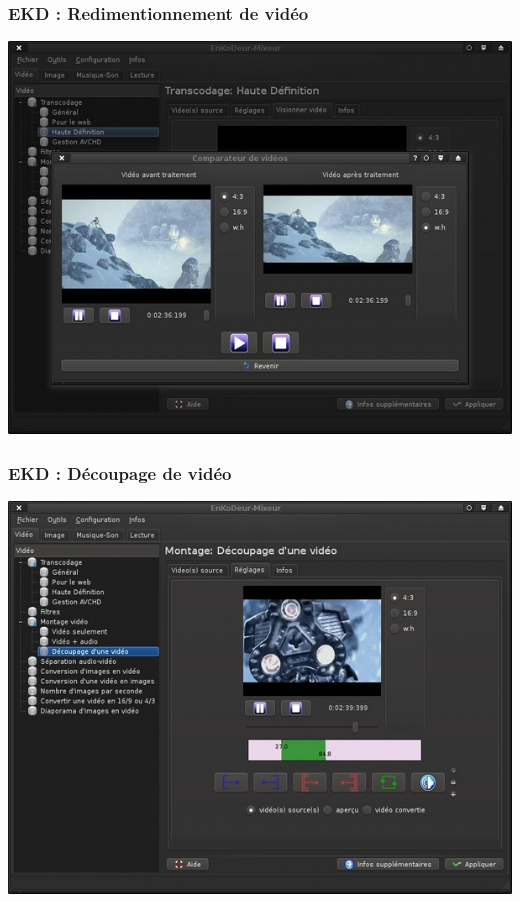 \begin{frame}
\frametitle{EKD : Redimentionnement de vidéo}
\includegraphics[scale=0.50]{ressources/ekd_linux_redim.jpg}
\end{frame}

\begin{frame}
\frametitle{EKD : Découpage de vidéo}
\includegraphics[scale=0.50]{ressources/ekd_linux_decoup.jpg}
\end{frame}

